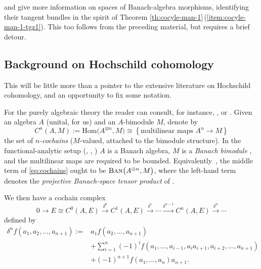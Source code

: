 \documentclass[10pt,a4paper]{amsart}
\numberwithin{equation}{section}
\newcommand{\cat}[1]{\text{\sc #1}}
\begin{document}
\cite[Theorem 8.2.3]{run-lec} and \cite[Theorem 4.5]{cg-amen} give more information on spaces of Banach-algebra morphisms, identifying their tangent bundles in the spirit of Theorem \ref{th:cocyle-man-1}\,(\ref{item:cocyle-man-1-tgz1}). This too follows from the preceding material, but requires a brief detour.

\subsection{Background on Hochschild cohomology}\label{subse:hoch}

This will be little more than a pointer to the extensive literature on Hochschild cohomology, and an opportunity to fix some notation.

For the purely algebraic theory the reader can consult, for instance, \cite[Section~1.9]{dales}, \cite[Chapter 11; especially Section~11.1]{pierce} or \cite[Sections~4 and 5]{ginz-ncg}. Given an algebra $A$ (unital, for us) and an $A$-bimodule $M$, denote by
\begin{equation}\label{eq:cochains}
 C^n(A,M):=\mathrm{Hom}\big(A^{\otimes n},M\big) \cong \left\{\text{multilinear maps }A^n\to M\right\}
\end{equation}
the set of {\it $n$-cochains} ($M$-valued, attached to the bimodule structure). In the functional-analytic setup (\cite[Section~1]{john-coh}, \cite[Section~2.8]{dales}, \cite[Section~7]{dael}) $A$ is a Banach algebra, $M$ is a {\it Banach bimodule} \cite[Definition 2.6.1]{dales}, and the multilinear maps are required to be bounded. Equivalently~\cite[Theorem 2.9]{ryan}, the middle term of \eqref{eq:cochains} ought to be $\cat{Ban}\big(A^{\otimes n},M\big)$,
where the left-hand term denotes the {\it projective Banach-space tensor product} of \cite[Section~2.1]{ryan}.

We then have a cochain complex
\begin{equation}\label{eq:hochcoc}
 0\xrightarrow{}
 E\cong C^0(A,E)
 \xrightarrow{\delta^0}
 C^1(A,E)
 \xrightarrow{\delta^1}
 \cdots \xrightarrow{\delta^{n-1}}
 C^n(A,E)
 \xrightarrow{\delta^n}
 \cdots
\end{equation}
defined by
\begin{align*}
 \delta^n f (a_1,a_2,\dots,a_{n+1}):={}& a_1 f(a_2,\dots,a_{n+1})\\
 &+\sum_{i=1}^{n} (-1)^{i} f(a_1,\dots,a_{i-1},a_i a_{i+1},a_{i+2},\dots,a_{n+1})\\
 &+(-1)^{n+1} f(a_1,\dots,a_n)a_{n+1}.
\end{align*}
\end{document}

